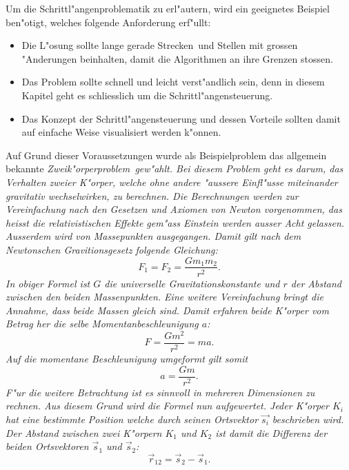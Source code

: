 \begin{refsection}
Um die Schrittl"angenproblematik zu erl"autern, wird ein geeignetes Beispiel ben"otigt, welches folgende Anforderung erf"ullt: 
\begin{itemize}
\item Die L"osung sollte \glqq lange gerade Strecken\grqq~und Stellen mit grossen "Anderungen beinhalten, damit die Algorithmen an ihre Grenzen stossen.
\item Das Problem sollte schnell und leicht verst"andlich sein, denn in diesem Kapitel geht es schliesslich um die Schrittl"angensteuerung.
\item Das Konzept der Schrittl"angensteuerung und dessen Vorteile sollten damit auf einfache Weise visualisiert werden k"onnen.
\end{itemize}
Auf Grund dieser Voraussetzungen wurde als Beispielproblem das allgemein bekannte \em Zweik"orperproblem\em~gew"ahlt.
Bei diesem Problem geht es darum, das Verhalten zweier K"orper, welche ohne andere "aussere Einfl"usse miteinander gravitativ wechselwirken, zu berechnen. 
Die Berechnungen werden zur Vereinfachung nach den Gesetzen und Axiomen von Newton vorgenommen, das heisst die relativistischen Effekte gem"ass Einstein werden ausser Acht gelassen.
Ausserdem wird von Massepunkten ausgegangen.
Damit gilt nach dem Newtonschen Gravitionsgesetz folgende Gleichung:
\begin{equation} \label{eq:newton}
F_1 = F_2=\frac{G m_1 m_2}{r^2}.
\end{equation}
In obiger Formel ist $G$ die universelle Gravitationskonstante und $r$ der Abstand zwischen den beiden Massenpunkten.
Eine weitere Vereinfachung bringt die Annahme, dass beide Massen gleich sind. 
Damit erfahren beide K"orper vom Betrag her die selbe Momentanbeschleunigung
$a$:
\[
F=\frac{G m^2}{r^2}=m a.
\]
Auf die momentane Beschleunigung umgeformt gilt somit
\begin{equation}
a=\frac{G m}{r^2}.\label{eq:beschleunigungSkalar}
\end{equation}
F"ur die weitere Betrachtung ist es sinnvoll in mehreren Dimensionen zu rechnen.
Aus diesem Grund wird die Formel nun aufgewertet.
Jeder K"orper $K_i$ hat eine bestimmte Position welche durch seinen Ortsvektor $\vec{s_i}$ beschrieben wird.
Der Abstand zwischen zwei K"orpern $K_1$ und $K_2$ ist damit die Differenz der beiden Ortsvektoren  $\vec{s}_1$ und $\vec{s}_2$:
\begin{equation} \label{eq:abstand}
\vec{r}_{12}= \vec{s}_2-\vec{s}_1.
\end{equation}

\end{refsection}
